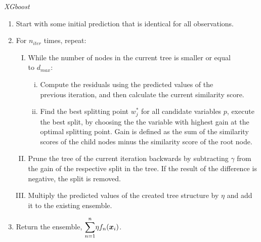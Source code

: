 \documentclass[a4paper,12pt, headsepline]{scrartcl}
\numberwithin{equation}{section}
\begin{document}
{\centering
	\begin{minipage}{.9\linewidth}
		\begin{algorithm}[H]
			\caption{\textit{XGboost}}\label{alg:two}
			\begin{enumerate}
				\item Start with some initial prediction that is identical for all observations.
				\item For $n_{iter}$ times, repeat:
				\begin{enumerate}[I.]
					\item While the number of nodes in the current tree is smaller or equal\\ to $d_ {max}$:
					\begin{enumerate}[i.]
						\item Compute the residuals using the predicted values of the\\ previous iteration, and then calculate the current similarity score.
						\item Find the best splitting point $w^*_j$ for all candidate variables $p$, execute the best split, by choosing the the variable with highest gain at the optimal splitting point. Gain is defined as the sum of the similarity scores of the child nodes minus the similarity score of the root node.
					\end{enumerate}
					\item Prune the tree of the current iteration backwards by subtracting $\gamma$ from the gain of the respective split in the tree. If the result of the difference is negative, the split is removed.
					\item Multiply the predicted values of the created tree structure by $\eta$ and add it to the existing ensemble.
				\end{enumerate} 
			\item Return the ensemble, $\mathlarger{\sum}\limits_{n = 1}^{n} \eta f_{n}(\bm x_i)$.
			\end{enumerate}
		\end{algorithm}
	\end{minipage}
	\par
}
\end{document}
